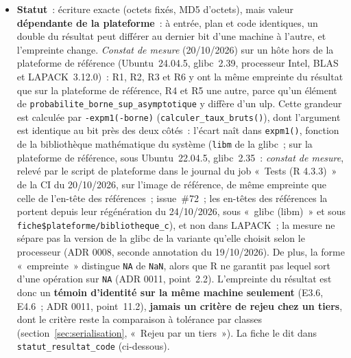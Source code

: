 \documentclass[a4paper,11pt]{article}
\newcommand{\code}[1]{\texttt{\small #1}}
\begin{document}
\begin{itemize}[leftmargin=*, itemsep=2pt]
    du 20/10/2026, (f), et par M71)~; son optimisation, qui devait garder le même texte
    empreinté, est l'objet de l'issue~\#71. Celle-ci a réécrit l'écriture
    des entiers et des dates sans une chaîne par ligne, à texte empreinté
    inchangé octet pour octet, identité \emph{constatée} sur les cas
    vérifiés, non démontrée (section~\ref{sec:verifications-rapport},
    «~Écriture des entiers et des dates~»). Le gain est un constat de
    mesure à $10^6$~lignes, hors plateforme de référence, consigné avec le
    commit \code{cf24e73}~; la cible de l'issue, un temps d'empreinte du
    résultat au plus égal à celui de l'empreinte des données
    (\code{empreinte\_donnees()}), n'est pas atteinte, et le mainteneur a
    accepté ce gain, cible manquée consignée (21/10/2026).
  \item \textbf{Statut}~: écriture exacte (octets fixés, MD5 d'octets), mais
    valeur \textbf{dépendante de la plateforme}~: à entrée, plan et code
    identiques, un double du résultat peut différer au dernier bit d'une
    machine à l'autre, et l'empreinte change. \emph{Constat de mesure}
    (20/10/2026) sur un
    hôte hors de la plateforme de référence (Ubuntu~24.04.5, glibc~2.39,
    processeur Intel, BLAS et LAPACK~3.12.0)~: R1, R2, R3 et R6 y ont la même
    empreinte du résultat que sur la plateforme de référence, R4 et R5 une
    autre, parce qu'un élément de
    \code{probabilite\_borne\_sup\_asymptotique} y diffère d'un ulp. Cette
    grandeur est calculée par \code{-expm1(-borne)}
    (\code{calculer\_taux\_bruts()}), dont l'argument est identique au bit
    près des deux côtés~: l'écart naît dans \code{expm1()}, fonction de la
    bibliothèque mathématique du système (\code{libm} de la glibc~; sur la plateforme de référence, sous
    Ubuntu~22.04.5, glibc~2.35~: \emph{constat de mesure}, relevé par le
    script de plateforme dans le journal du job «~Tests (R 4.3.3)~» de la CI
    du 20/10/2026, sur l'image de référence, de même empreinte que celle de
    l'en-tête des références~; issue~\#72~; les en-têtes des
    références la portent depuis leur régénération du 24/10/2026, sous
    «~glibc (libm)~» et sous \code{fiche\$plateforme/bibliotheque\_c}), et non dans
    LAPACK~; la mesure ne sépare pas la version de la glibc de la variante
    qu'elle choisit selon le processeur (ADR 0008, seconde annotation du
    19/10/2026). De plus, la forme «~empreinte~» distingue \code{NA} de
    \code{NaN}, alors que R ne garantit pas lequel sort d'une opération sur
    \code{NA} (ADR 0011, point~2.2). L'empreinte du résultat est donc un
    \textbf{témoin d'identité sur la même machine seulement} (E3.6, E4.6~;
    ADR 0011, point~11.2), \textbf{jamais un critère de rejeu chez un tiers},
    dont le critère reste la comparaison à tolérance par classes
    (section~\ref{sec:serialisation}, «~Rejeu par un tiers~»). La fiche le dit
    dans \code{statut\_resultat\_code} (ci-dessous).
\end{itemize}
\end{document}
